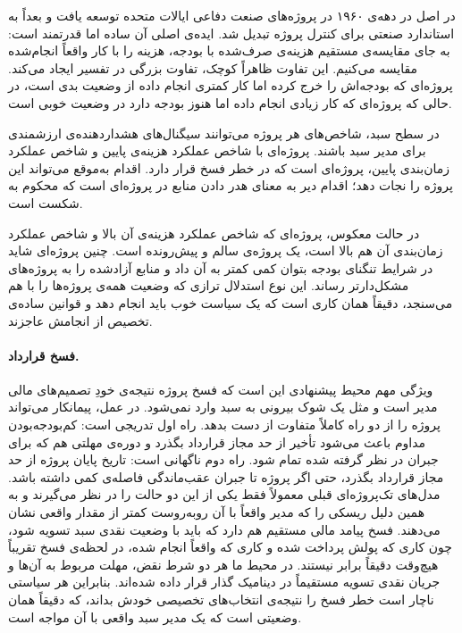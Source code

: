  در اصل در دهه‌ی ۱۹۶۰ در پروژه‌های صنعت دفاعی ایالات متحده
توسعه یافت و بعداً به استاندارد صنعتی برای کنترل پروژه تبدیل شد.
ایده‌ی اصلی آن ساده اما قدرتمند است: به جای مقایسه‌ی مستقیم
هزینه‌ی صرف‌شده با بودجه، هزینه را با کار واقعاً انجام‌شده مقایسه
می‌کنیم. این تفاوت ظاهراً کوچک، تفاوت بزرگی در تفسیر ایجاد می‌کند.
پروژه‌ای که بودجه‌اش را خرج کرده اما کار کمتری انجام داده از
وضعیت بدی است، در حالی که پروژه‌ای که کار زیادی انجام داده اما
هنوز بودجه دارد در وضعیت خوبی است.

در سطح سبد، شاخص‌های  هر پروژه می‌توانند سیگنال‌های
هشداردهنده‌ی ارزشمندی برای مدیر سبد باشند. پروژه‌ای با شاخص
عملکرد هزینه‌ی پایین و شاخص عملکرد زمان‌بندی پایین، پروژه‌ای است
که در خطر فسخ قرار دارد. اقدام به‌موقع می‌تواند این پروژه را
نجات دهد؛ اقدام دیر به معنای هدر دادن منابع در پروژه‌ای است که
محکوم به شکست است.

در حالت معکوس، پروژه‌ای که شاخص عملکرد هزینه‌ی آن بالا و
شاخص عملکرد زمان‌بندی آن هم بالا است، یک پروژه‌ی سالم و
پیش‌رونده است. چنین پروژه‌ای شاید در شرایط تنگنای بودجه
بتوان کمی کمتر به آن داد و منابع آزادشده را به پروژه‌های مشکل‌دارتر
رساند. این نوع استدلال ترازی که وضعیت همه‌ی پروژه‌ها را با هم
می‌سنجد، دقیقاً همان کاری است که یک سیاست خوب باید انجام دهد
و قوانین ساده‌ی تخصیص از انجامش عاجزند.

\paragraph{فسخ قرارداد.}
ویژگی مهم محیط پیشنهادی این است که فسخ پروژه نتیجه‌ی خودِ
تصمیم‌های مالی مدیر است و مثل یک شوک بیرونی به سبد وارد نمی‌شود.
در عمل، پیمانکار می‌تواند پروژه را از دو راه کاملاً متفاوت از
دست بدهد.
راه اول تدریجی است: کم‌بودجه‌بودن مداوم باعث می‌شود تأخیر از حد
مجاز قرارداد بگذرد و دوره‌ی مهلتی هم که برای جبران در نظر گرفته
شده تمام شود.
راه دوم ناگهانی است: تاریخ پایان پروژه از حد مجاز قرارداد بگذرد،
حتی اگر پروژه تا جبران عقب‌ماندگی فاصله‌ی کمی داشته باشد.
مدل‌های تک‌پروژه‌ای قبلی معمولاً فقط یکی از این دو حالت را در نظر
می‌گیرند و به همین دلیل ریسکی را که مدیر واقعاً با آن روبه‌روست
کمتر از مقدار واقعی نشان می‌دهند.
فسخ پیامد مالی مستقیم هم دارد که باید با وضعیت نقدی سبد تسویه
شود، چون کاری که پولش پرداخت شده و کاری که واقعاً انجام شده،
در لحظه‌ی فسخ تقریباً هیچ‌وقت دقیقاً برابر نیستند.
در محیط ما هر دو شرط نقض، مهلت مربوط به آن‌ها و جریان نقدی تسویه
مستقیماً در دینامیک گذار قرار داده شده‌اند.
بنابراین هر سیاستی ناچار است خطر فسخ را نتیجه‌ی انتخاب‌های
تخصیصی خودش بداند، که دقیقاً همان وضعیتی است که یک مدیر سبد
واقعی با آن مواجه است.

